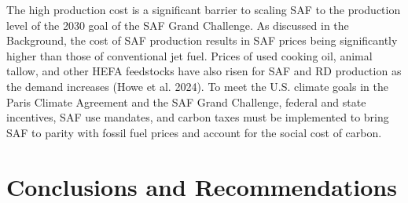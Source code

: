 \documentclass[12pt]{article}
\begin{document}
 The high production cost is a significant barrier to scaling SAF to the production level of the 2030 goal of the SAF Grand Challenge. As discussed in the Background, the cost of SAF production results in SAF prices being significantly higher than those of conventional jet fuel. Prices of used cooking oil, animal tallow, and other HEFA feedstocks have also risen for SAF and RD production as the demand increases (Howe et al. 2024). To meet the U.S. climate goals in the Paris Climate Agreement and the SAF Grand Challenge, federal and state incentives, SAF use mandates, and carbon taxes must be implemented to bring SAF to parity with fossil fuel prices and account for the social cost of carbon.


\section{Conclusions and Recommendations}
\end{document}
